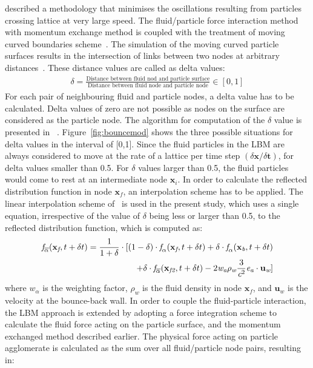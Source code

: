 \citet{Ladd2001} described a methodology that minimises the oscillations resulting from particles crossing lattice at very large speed. The fluid/particle force interaction method with momentum exchange method is coupled with the treatment of moving curved boundaries scheme~\citep{yu2002unified,yu2003viscous}. The simulation of the moving curved particle surfaces results in the intersection of links between two nodes at arbitrary distances~\citep{iglberger2008}. These distance values are called as delta values:
\begin{align}
\delta = \frac{\mbox{Distance between fluid nod and particle surface}}{\mbox{Distance between fluid node and particle node}} \in [0,1]
\end{align} 
For each pair of neighbouring fluid and particle nodes, a delta value has to be calculated. Delta values of zero are not possible as nodes on the surface are considered as the particle node. The algorithm for computation of the $\delta$ value is presented in ~\citet{iglberger2008}. Figure~\ref{fig:bouncemod} shows the three possible situations for delta values in the interval of [0,1]. Since the fluid particles in the LBM are always considered to move at the rate of a lattice per time step $(\delta \mathbf{x}/ \delta \mathbf{t})$, for delta values smaller than 0.5. For $\delta$ values larger than 0.5, the fluid particles would come to rest at an intermediate node $\mathbf{x}_{\textit{i}}$. In order to calculate the reflected distribution function in node $\mathbf{x}_{\textit{f}}$, an interpolation scheme has to be applied. The linear interpolation scheme of~\citet{yu2002unified, yu2003viscous} is used in the present study, which uses a single equation, irrespective of the value of $\delta$ being less or larger than 0.5, to the reflected distribution function, which is computed as:
\begin{align}
 \nonumber
\textit{\textit{f}}_{\overline{\alpha}}(\mathbf{x}_{\textit{f}},t + \delta t) = \frac{1}{1 + \delta} \cdot [(1-\delta)\cdot \textit{\textit{f}}_{\alpha}(\mathbf{x}_{\textit{f}},t + \delta t) + \delta \cdot \textit{\textit{f}}_{\alpha}(\mathbf{x}_{\textit{b}},t + \delta t)  \\
+ \delta \cdot \textit{\textit{f}}_{\overline{\alpha}}(\mathbf{x}_{\textit{f2}},t + \delta t) -2\textit{w}_{\textit{a}}\rho_{\textit{w}}\frac{3}{\textit{c}^{2}}\mathbf{\textit{e}}_{\textit{a}}\cdot \mathbf{u}_{\textit{w}}]
\end{align}
where $\textit{w}_{\alpha}$ is the weighting factor, $\rho_{\textit{w}}$ is the fluid density in node $\mathbf{x}_{\textit{f}}$, and $ \mathbf{u}_{\textit{w}}  $ is the velocity at the bounce-back wall. In order to couple the fluid-particle interaction, the LBM approach is extended by adopting a force integration scheme to calculate the fluid force acting on the particle surface, and the momentum exchanged method described earlier. The physical force acting on particle agglomerate is calculated as the sum over all fluid/particle node pairs, resulting in: 
